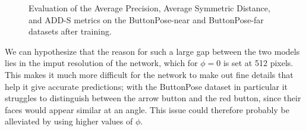 \begin{figure}[htp]


    \caption{Evaluation of the Average Precision, Average Symmetric Distance, and ADD-S metrics on the ButtonPose-near and ButtonPose-far datasets after training.}
    \label{fig:near_vs_far_results}
\end{figure}

We can hypothesize that the reason for such a large gap between the two models lies in the imput resolution of the network, which for $\phi = 0$ is set at 512 pixels. This makes it much more difficult for the network to make out fine details that help it give accurate predictions; with the ButtonPose dataset in particular it struggles to distinguish between the arrow button and the red button, since their faces would appear similar at an angle. This issue could therefore probably be alleviated by using higher values of $\phi$.


